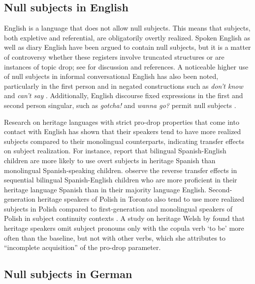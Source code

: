 \documentclass[output=paper,colorlinks,citecolor=brown]{langscibook}
\begin{document}
\subsection{Null subjects in English}
English is a language that does not allow null subjects. This means that subjects, both expletive and referential, are obligatorily overtly realized.
Spoken English as well as diary English have been argued to contain null subjects, but it is a matter of controversy whether these registers involve truncated structures or are instances of topic drop; see \textcite{HaegemanIhsane2001} for discussion and references. A noticeable higher use of null subjects in informal conversational English has also been noted, particularly in the first person and in negated constructions such as \textit{don't know} and \textit{can't say} \parencite{harvie1998null, nagy2011null}. Additionally, English discourse fixed expressions in the first and second person singular, such as \textit{gotcha!} and \textit{wanna go?} permit null subjects \parencite{Haegeman+2010+167+174}.

Research on heritage languages with strict pro-drop properties that come into contact with English has shown that their speakers tend to have more realized subjects compared to their monolingual counterparts, indicating transfer effects on subject realization. For instance,  \textcite{paradis2003subject} report that bilingual Spanish-English children are more likely to use overt subjects in heritage Spanish than monolingual Spanish-speaking children. \textcite{austin2017null} observe the reverse transfer effects in sequential bilingual Spanish-English children who are more proficient in their heritage language Spanish than in their majority language English.
Second-generation heritage speakers of Polish in Toronto also tend to use more realized subjects in Polish compared to first-generation and monolingual speakers of Polish in subject continuity contexts \parencite{chociej2011polish}. A study on heritage Welsh by \textcite{boon2014heritage} found that heritage speakers omit subject pronouns only with the copula verb `to be' more often than the baseline, but not with other verbs, which she attributes to ``incomplete acquisition'' of the pro-drop parameter.

\subsection{Null subjects in German}
\end{document}
